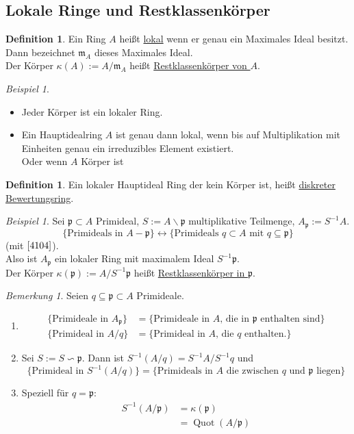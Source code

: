 \documentclass[10pt,a4paper]{article}
\newcommand{\Quot}{\operatorname{Quot}}
\newcounter{thm}[section]
\theoremstyle{definition}
\newtheorem{definition}[thm]{Definition}
\theoremstyle{plain}
\theoremstyle{remark}
\newtheorem{bem}[thm]{Bemerkung}
\newtheorem{exm}[thm]{Beispiel}
\begin{document}
\subsection{Lokale Ringe und Restklassenkörper}
\begin{definition}
	Ein Ring $A$ heißt \underline{lokal} wenn er genau ein Maximales Ideal besitzt.\\
	Dann bezeichnet $\mathfrak m_A$ dieses Maximales Ideal.\\
	Der Körper $\kappa(A):=A/\mathfrak m_A$ heißt \underline{Restklassenkörper von $A$}.
\end{definition}
\begin{exm}
	\begin{itemize}
		\item Jeder Körper ist ein lokaler Ring.
		\item Ein Hauptidealring $A$ ist genau dann lokal, wenn bis auf Multiplikation mit Einheiten genau ein irreduzibles Element existiert.\\
		Oder wenn $A$ Körper ist
	\end{itemize}
\end{exm}
\begin{definition}
	Ein lokaler Hauptideal Ring der kein Körper ist, heißt \underline{diskreter Bewertungsring}.
\end{definition}
\begin{exm}
	Sei $\mathfrak p\subset A$ Primideal, $S:=A\backslash \mathfrak p$ multiplikative Teilmenge, $A_{\mathfrak p}:=S^{-1}A$.
	\[\{\text{Primideals in $A-\mathfrak p$}\}\leftrightarrow\{\text{Primideals $q\subset A$ mit $q\subseteq \mathfrak p$}\}\]
	(mit $\ref{4104}$).\\ 
	Also ist $A_{\mathfrak p}$ ein lokaler Ring mit maximalem Ideal $S^{-1}\mathfrak p$.\\
	Der Körper $\kappa(\mathfrak p):=A/S^{-1}\mathfrak p$ heißt \underline{Restklassenkörper in $\mathfrak p$}.
\end{exm}
\begin{bem}
	Seien $q\subseteq\mathfrak p\subset A$ Primideale.\begin{enumerate}
		\item \begin{align*}
		\{\text{Primideale in $A_{\mathfrak p}$}\}&=\{\text{Primideale in $A$, die in $\mathfrak p$ enthalten sind}\}\\
		\{\text{Primideal in $A/q$}\}&=\{\text{Primideal in $A$, die $q$ enthalten.}\}
		\end{align*}
		\item  Sei $S:=S\backsim\mathfrak p$. Dann ist $S^{-1}(A/q)=S^{-1} A/S^{-1}q$ und
		\[\{\text{Primideal in $S^{-1}(A/q)$}\}=\{\text{Primideals in $A$ die zwischen $q$ und $\mathfrak p$ liegen}\}\]
		\item Speziell für $q=\mathfrak p$:
		\begin{align*}
		S^{-1}(A/\mathfrak p)&=\kappa(\mathfrak p)\\
		&=\Quot(A/\mathfrak p)
		\end{align*}
	\end{enumerate}
\end{bem}
\end{document}

